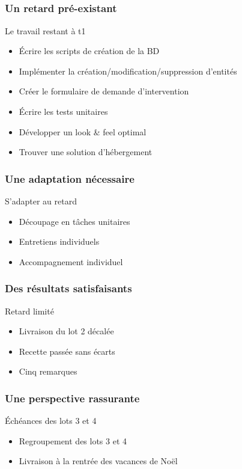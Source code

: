 \speaker{\Pierre{}}
\subsection{} %

\begin{frame}
\frametitle{Un retard pré-existant}
\begin{block}{Le travail restant à t1}
\begin{itemize}
	\item Écrire les scripts de création de la BD
	\item Implémenter la création/modification/suppression d'entités
	\item Créer le formulaire de demande d'intervention
	\item Écrire les tests unitaires
	\item Développer un look \& feel optimal
	\item Trouver une solution d’hébergement
\end{itemize}
\end{block}
\end{frame}


\begin{frame}
\frametitle{Une adaptation nécessaire}
\begin{block}{S'adapter au retard}
\begin{itemize}
	\item Découpage en tâches unitaires
	\item Entretiens individuels
	\item Accompagnement individuel
\end{itemize}
\end{block}
\end{frame}


\begin{frame}
\frametitle{Des résultats satisfaisants}
\begin{block}{Retard limité}
\begin{itemize}
	\item Livraison du lot 2 décalée
	\item Recette passée sans écarts
	\item Cinq remarques
\end{itemize}
\end{block}
\end{frame}


\begin{frame}
\frametitle{Une perspective rassurante}
\begin{block}{Échéances des lots 3 et 4}
\begin{itemize}
	\item Regroupement des lots 3 et 4
	\item Livraison à la rentrée des vacances de Noël
\end{itemize}
\end{block}
\end{frame}



